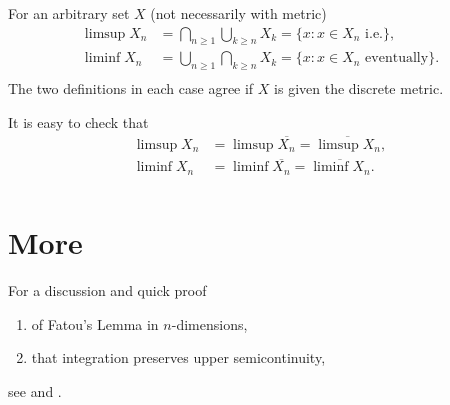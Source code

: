\documentclass[a4paper]{amsart}
\theoremstyle{plain}
\theoremstyle{definition}
\theoremstyle{remark}
\begin{document}
For an arbitrary set $ X $ (not necessarily with  metric)  
 \begin{align*}
\limsup X_n &= \bigcap _{n\geq 1} \bigcup_{k\geq n} X_k = \{ x : x \in X_n \text{ i.e.}\} ,\\
\liminf X_n &= \bigcup _{n\geq 1} \bigcap_{k\geq n} X_k = \{ x : x \in X_n \text{ eventually}\} .\\
 \end{align*} 
The two definitions in each case agree if $ X $ is given the discrete metric.

\bigskip
It is easy to check that
\begin{align*}
\limsup X_n &= \limsup \overline{X_n} =\overline{\limsup X_n},\\
\liminf X_n &= \liminf \overline{X_n} =\overline{\liminf X_n}.\\
\end{align*} 







\section{\textbf{More}} 
 
For a discussion and quick proof 
\begin{enumerate}
\item
of Fatou's Lemma in $ n $-dimensions,
\item that integration preserves upper semicontinuity,
\end{enumerate}
see \cite{Aum} and \cite{RY}.
 

\end{document}
